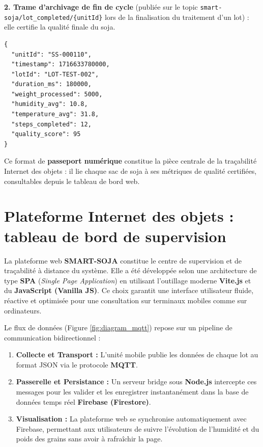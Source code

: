 \vspace{0.3cm}
\noindent\textbf{2. Trame d'archivage de fin de cycle} (publiée sur le topic \texttt{smart-soja/lot\_completed/\{unitId\}} lors de la finalisation du traitement d'un lot) : elle certifie la qualité finale du soja.
\begin{verbatim}
{
  "unitId": "SS-000110",
  "timestamp": 1716633780000,
  "lotId": "LOT-TEST-002",
  "duration_ms": 180000,
  "weight_processed": 5000,
  "humidity_avg": 10.8,
  "temperature_avg": 31.8,
  "steps_completed": 12,
  "quality_score": 95
}
\end{verbatim}
\vspace{0.2cm}

Ce format de \textbf{passeport numérique} constitue la pièce centrale de la traçabilité Internet des objets : il lie chaque sac de soja à ses métriques de qualité certifiées, consultables depuis le tableau de bord web.

\section{Plateforme Internet des objets : tableau de bord de supervision}
La plateforme web \textbf{SMART-SOJA} constitue le centre de supervision et de traçabilité à distance du système. Elle a été développée selon une architecture de type \textbf{SPA} (\textit{Single Page Application}) en utilisant l'outillage moderne \textbf{Vite.js} et du \textbf{JavaScript (Vanilla JS)}. Ce choix garantit une interface utilisateur fluide, réactive et optimisée pour une consultation sur terminaux mobiles comme sur ordinateurs.

Le flux de données (Figure \ref{fig:diagram_mqtt}) repose sur un pipeline de communication bidirectionnel :
\begin{enumerate}
    \item \textbf{Collecte et Transport :} L'unité mobile publie les données de chaque lot au format JSON via le protocole \textbf{MQTT}.
    \item \textbf{Passerelle et Persistance :} Un serveur bridge sous \textbf{Node.js} intercepte ces messages pour les valider et les enregistrer instantanément dans la base de données temps réel \textbf{Firebase (Firestore)}.
    \item \textbf{Visualisation :} La plateforme web se synchronise automatiquement avec Firebase, permettant aux utilisateurs de suivre l'évolution de l'humidité et du poids des grains sans avoir à rafraîchir la page.
\end{enumerate}

